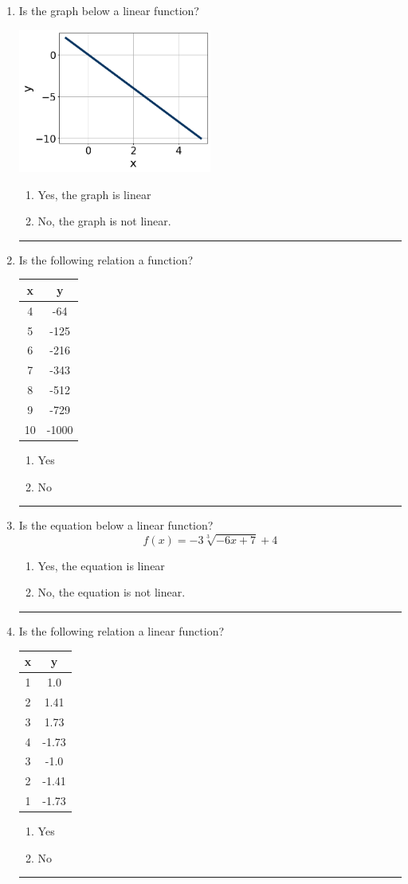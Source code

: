 \documentclass[14pt]{extbook}
\newcommand{\litem}[1]{\item#1\hspace*{-1cm}\rule{\textwidth}{0.4pt}}
\begin{document}
\begin{enumerate}
{\begin{enumerate}[label=\Alph*.]
\end{enumerate} }
\litem{
Is the graph below a linear function?
\begin{center}
    \includegraphics[width=0.5\textwidth]{../Figures/MA_8_F_1_2_graphM.png}
\end{center}
\begin{enumerate}[label=\Alph*.]
\item Yes, the graph is linear
\item No, the graph is not linear.

\end{enumerate} }
\litem{
Is the following relation a function?

\begin{tabular}{c|c}
x &y\tabularnewline \hline
4 &-64\tabularnewline \hline
5 &-125\tabularnewline \hline
6 &-216\tabularnewline \hline
7 &-343\tabularnewline \hline
8 &-512\tabularnewline \hline
9 &-729\tabularnewline \hline
10 &-1000\end{tabular}\begin{enumerate}[label=\Alph*.]
\item Yes
\item No

\end{enumerate} }
\litem{
Is the equation below a linear function?\[ f(x) = {-3}\sqrt[3]{-6x + 7}+4 \]\begin{enumerate}[label=\Alph*.]
\item Yes, the equation is linear
\item No, the equation is not linear.

\end{enumerate} }
\litem{
Is the following relation a linear function?

\begin{tabular}{c|c}
x &y\tabularnewline \hline
1 &1.0\tabularnewline \hline
2 &1.41\tabularnewline \hline
3 &1.73\tabularnewline \hline
4 &-1.73\tabularnewline \hline
3 &-1.0\tabularnewline \hline
2 &-1.41\tabularnewline \hline
1 &-1.73\end{tabular}\begin{enumerate}[label=\Alph*.]
\item Yes
\item No


\end{enumerate}}
\end{enumerate}
\end{document}
